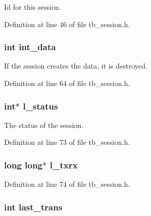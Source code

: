 Id for this session. 



Definition at line 46 of file tb\-\_\-session.\-h.

\hypertarget{structtb__session__t_adf89a25c6c2cefbabf86ff4e7931032e}{
\subsubsection[{int\-\_\-data}]{\setlength{\rightskip}{0pt plus 5cm}int int\-\_\-data}}\label{structtb__session__t_adf89a25c6c2cefbabf86ff4e7931032e}


If the session creates the data, it is destroyed. 



Definition at line 64 of file tb\-\_\-session.\-h.

\hypertarget{structtb__session__t_a22cc288b7e9b2ffe6053aeac5914cb40}{
\subsubsection[{l\-\_\-status}]{\setlength{\rightskip}{0pt plus 5cm}int$\ast$ l\-\_\-status}}\label{structtb__session__t_a22cc288b7e9b2ffe6053aeac5914cb40}


The status of the session. 



Definition at line 73 of file tb\-\_\-session.\-h.

\hypertarget{structtb__session__t_a98701b8da6c02c1671dd748b2251cea7}{
\subsubsection[{l\-\_\-txrx}]{\setlength{\rightskip}{0pt plus 5cm}long long$\ast$ l\-\_\-txrx}}\label{structtb__session__t_a98701b8da6c02c1671dd748b2251cea7}


Definition at line 74 of file tb\-\_\-session.\-h.

\hypertarget{structtb__session__t_ad3547e4d09ba01be9e898cf841504521}{
\subsubsection[{last\-\_\-trans}]{\setlength{\rightskip}{0pt plus 5cm}int last\-\_\-trans}}\label{structtb__session__t_ad3547e4d09ba01be9e898cf841504521}


